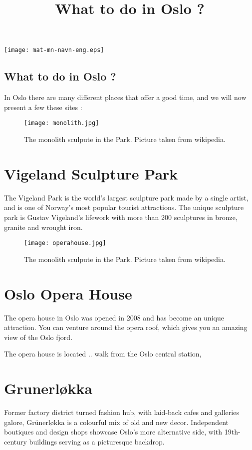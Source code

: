 \documentclass{article}
\title{What to do in Oslo ? }
\begin{document}
\texttt{[image: mat-mn-navn-eng.eps]} 


\begin{center}
\section*{What to do in Oslo ?}
In Oslo there are many different places that offer a good time, and we will now present a few these sites : 


\end{center}
\begin{wrapfigure}[20]{r}{0.5\textwidth}
    \centering
    \captionsetup{width=0.4\textwidth}
    \texttt{[image: monolith.jpg]}%
     \caption{The monolith sculpute in the Park. Picture taken from wikipedia. }
\end{wrapfigure}

\section*{Vigeland Sculpture Park} 

The Vigeland Park is the world's largest sculpture park made by a single artist, and is one of Norway's most popular tourist attractions. The unique sculpture park is Gustav Vigeland's lifework with more than 200 sculptures in bronze, granite and wrought iron. 

\vspace{2cm}
\begin{wrapfigure}[20]{l}{0.5\textwidth}
    \centering
    \texttt{[image: operahouse.jpg]}%
     \caption{The monolith sculpute in the Park. Picture taken from wikipedia. }
\end{wrapfigure}



\section*{Oslo Opera House}
The opera house in Oslo was opened in 2008 and has become an unique attraction. 
You can venture around the opera roof, which gives you an amazing view of the Oslo fjord. 

The opera house is located .. walk from the Oslo central station, 

\section*{Grunerløkka}


{\color{red}
Former factory district turned fashion hub, with laid-back cafes and galleries galore, Grünerløkka is a colourful mix of old and new decor. Independent boutiques and design shops showcase Oslo’s more alternative side, with 19th-century buildings serving as a picturesque backdrop. }
\end{document}
